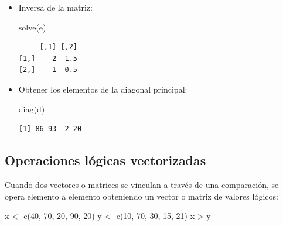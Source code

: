 \documentclass[
]{book}
\newenvironment{Shaded}{\begin{snugshade}}{\end{snugshade}}
\newcommand{\DecValTok}[1]{\textcolor[rgb]{0.00,0.00,0.81}{#1}}
\newcommand{\FunctionTok}[1]{\textcolor[rgb]{0.00,0.00,0.00}{#1}}
\newcommand{\NormalTok}[1]{#1}
\newcommand{\OtherTok}[1]{\textcolor[rgb]{0.56,0.35,0.01}{#1}}
\newcommand{\SpecialCharTok}[1]{\textcolor[rgb]{0.00,0.00,0.00}{#1}}
\begin{document}
\begin{itemize}
\begin{verbatim}
     [,1] [,2]
[1,]    9   23
[2,]   14   36
[3,]    4   10
\end{verbatim}
\item
  Inversa de la matriz:

\begin{Shaded}
\begin{Highlighting}[]
\FunctionTok{solve}\NormalTok{(e)}
\end{Highlighting}
\end{Shaded}

\begin{verbatim}
     [,1] [,2]
[1,]   -2  1.5
[2,]    1 -0.5
\end{verbatim}
\item
  Obtener los elementos de la diagonal principal:

\begin{Shaded}
\begin{Highlighting}[]
\FunctionTok{diag}\NormalTok{(d)}
\end{Highlighting}
\end{Shaded}

\begin{verbatim}
[1] 86 93  2 20
\end{verbatim}
\end{itemize}

\hypertarget{operaciones-luxf3gicas-vectorizadas}{%
\subsection{Operaciones lógicas vectorizadas}\label{operaciones-luxf3gicas-vectorizadas}}

Cuando dos vectores o matrices se vinculan a través de una comparación, se opera elemento a elemento obteniendo un vector o matriz de valores lógicos:

\begin{Shaded}
\begin{Highlighting}[]
\NormalTok{x }\OtherTok{\textless{}{-}} \FunctionTok{c}\NormalTok{(}\DecValTok{40}\NormalTok{, }\DecValTok{70}\NormalTok{, }\DecValTok{20}\NormalTok{, }\DecValTok{90}\NormalTok{, }\DecValTok{20}\NormalTok{)}
\NormalTok{y }\OtherTok{\textless{}{-}} \FunctionTok{c}\NormalTok{(}\DecValTok{10}\NormalTok{, }\DecValTok{70}\NormalTok{, }\DecValTok{30}\NormalTok{, }\DecValTok{15}\NormalTok{, }\DecValTok{21}\NormalTok{)}
\NormalTok{x }\SpecialCharTok{\textgreater{}}\NormalTok{ y}
\end{Highlighting}
\end{Shaded}
\end{document}
